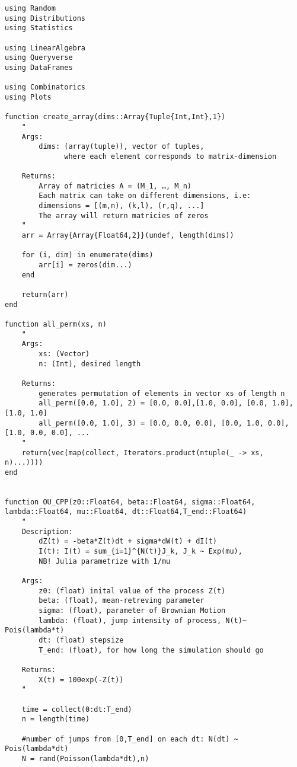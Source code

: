 \begin{verbatim}
using Random 
using Distributions
using Statistics

using LinearAlgebra
using Queryverse
using DataFrames

using Combinatorics
using Plots

function create_array(dims::Array{Tuple{Int,Int},1})
    "
    Args: 
        dims: (array(tuple)), vector of tuples, 
              where each element corresponds to matrix-dimension
    
    Returns:
        Array of matricies A = (M_1, …, M_n)
        Each matrix can take on different dimensions, i.e:
        dimensions = [(m,n), (k,l), (r,q), ...] 
        The array will return matricies of zeros    
    "
    arr = Array{Array{Float64,2}}(undef, length(dims))

    for (i, dim) in enumerate(dims)
        arr[i] = zeros(dim...)
    end

    return(arr)
end

function all_perm(xs, n)
    " 
    Args: 
        xs: (Vector)
        n: (Int), desired length
    
    Returns:
        generates permutation of elements in vector xs of length n
        all_perm([0.0, 1.0], 2) = [0.0, 0.0],[1.0, 0.0], [0.0, 1.0], [1.0, 1.0]
        all_perm([0.0, 1.0], 3) = [0.0, 0.0, 0.0], [0.0, 1.0, 0.0], [1.0, 0.0, 0.0], ...
    "
    return(vec(map(collect, Iterators.product(ntuple(_ -> xs, n)...))))
end 


function OU_CPP(z0::Float64, beta::Float64, sigma::Float64, lambda::Float64, mu::Float64, dt::Float64,T_end::Float64)
    " 
    Description:
        dZ(t) = -beta*Z(t)dt + sigma*dW(t) + dI(t)
        I(t): I(t) = sum_{i=1}^{N(t)}J_k, J_k ~ Exp(mu), 
        NB! Julia parametrize with 1/mu

    Args:    
        z0: (float) inital value of the process Z(t)
        beta: (float), mean-retreving parameter
        sigma: (float), parameter of Brownian Motion
        lambda: (float), jump intensity of process, N(t)~ Pois(lambda*t) 
        dt: (float) stepsize 
        T_end: (float), for how long the simulation should go
     
    Returns: 
        X(t) = 100exp(-Z(t))
    "

    time = collect(0:dt:T_end) 
    n = length(time)

    #number of jumps from [0,T_end] on each dt: N(dt) ~ Pois(lambda*dt)
    N = rand(Poisson(lambda*dt),n) 


\end{verbatim}
